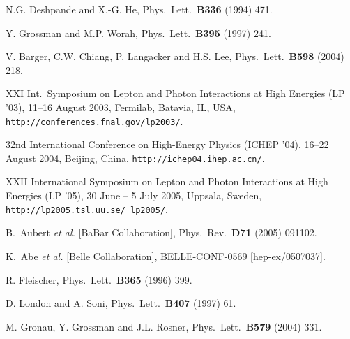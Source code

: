 \documentclass[12pt]{article}
\begin{document}
\begin{thebibliography}{999}
N.G. Deshpande and X.-G. He, { Phys.\ Lett.}~{\bf B336} (1994)
471.

Y. Grossman and M.P. Worah,
  { Phys.\ Lett.}~{\bf B395} (1997) 241.

V. Barger, C.W. Chiang, P. Langacker and H.S. Lee,
  { Phys.\ Lett.}~{\bf B598} (2004) 218.

XXI Int.\ Symposium on Lepton and Photon Interactions
at High Energies (LP '03), 11--16 August 2003, Fermilab, Batavia, IL, USA, 
{\tt http://conferences.fnal.gov/lp2003/}.

32nd International Conference on High-Energy Physics
(ICHEP '04), 16--22 August 2004, Beijing, China, 
{\tt http://ichep04.ihep.ac.cn/}.

XXII International Symposium on Lepton and Photon Interactions
at High Energies (LP '05), 30 June -- 5 July 2005, Uppsala, Sweden,
{\tt http://lp2005.tsl.uu.se/~lp2005/}.

B.~Aubert {\it et al.}  [BaBar Collaboration],
  { Phys.\ Rev.}~{\bf D71} (2005) 091102.

K.~Abe {\it et al.}  [Belle Collaboration],
  BELLE-CONF-0569 [hep-ex/0507037].

R. Fleischer,
 { Phys.\ Lett.}~{\bf B365} (1996) 399.

D. London and A. Soni,
  { Phys.\ Lett.}~{\bf B407} (1997) 61.

M. Gronau, Y. Grossman and J.L. Rosner,
  { Phys.\ Lett.}~{\bf B579} (2004) 331.
  

\end{thebibliography}
\end{document}
